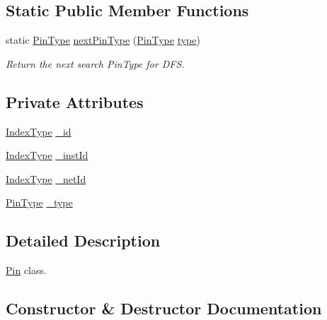 \subsection*{Static Public Member Functions}
\begin{DoxyCompactItemize}
\item 
static \hyperlink{type_8h_afaab50027002ecbb6c8ac27e727d1bb4}{Pin\+Type} \hyperlink{classPin_a86313ccf5cf94894c0d6cece183cb25d}{next\+Pin\+Type} (\hyperlink{type_8h_afaab50027002ecbb6c8ac27e727d1bb4}{Pin\+Type} \hyperlink{classPin_a788397e41a9a4fa196b36f8076eb6d6c}{type})
\begin{DoxyCompactList}\small\item\em Return the next search Pin\+Type for D\+FS. \end{DoxyCompactList}\end{DoxyCompactItemize}
\subsection*{Private Attributes}
\begin{DoxyCompactItemize}
\item 
\hyperlink{type_8h_a581e8093e28e7362f2b6937296190676}{Index\+Type} \hyperlink{classPin_ad40a8453e8fa16e12e17f661bfc36f69}{\+\_\+id}
\item 
\hyperlink{type_8h_a581e8093e28e7362f2b6937296190676}{Index\+Type} \hyperlink{classPin_aa9bd5211cedd081a572476545f5bf498}{\+\_\+inst\+Id}
\item 
\hyperlink{type_8h_a581e8093e28e7362f2b6937296190676}{Index\+Type} \hyperlink{classPin_a703ff6aea39f28b40e7d5d4dfb708a67}{\+\_\+net\+Id}
\item 
\hyperlink{type_8h_afaab50027002ecbb6c8ac27e727d1bb4}{Pin\+Type} \hyperlink{classPin_a0a660d777203aca04685f4cdf6623f72}{\+\_\+type}
\end{DoxyCompactItemize}


\subsection{Detailed Description}
\hyperlink{classPin}{Pin} class. 

\subsection{Constructor \& Destructor Documentation}
\mbox{\label{classPin_a6fbd67b1c9ed59f0af668f675bbc561f}} 
